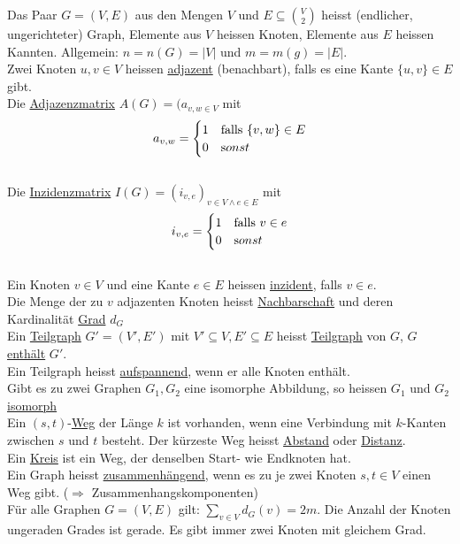 \documentclass{scrartcl}
\begin{document}
\begin{shaded}
Das Paar $G=(V,E)$ aus den Mengen $V$ und $E\subseteq\binom{V}{2}$ heisst (endlicher, ungerichteter) Graph, Elemente aus $V$ heissen Knoten, Elemente aus $E$ heissen Kannten. Allgemein: $n=n(G)=\vert V\vert$ und $m=m(g)=\vert E\vert$. \\
Zwei Knoten $u,v\in V$ heissen \underline{adjazent} (benachbart), falls es eine Kante $\{u,v\}\in E$ gibt. \\
Die \underline{Adjazenzmatrix} $A(G)=(a_{v,w\in V}$ mit \[a_{v,w}=
\begin{cases}
1 & \textrm{falls } \{v,w\} \in E \\
0 & \textrm sonst
\end{cases} \] \\
Die \underline{Inzidenzmatrix} $I(G)=(i_{v,e})_{v\in V \wedge e\in E}$ mit \[i_{v,e}=
\begin{cases}
1 & \textrm{falls } v\in e \\
0 & \textrm sonst
\end{cases} \] \\
Ein Knoten $v\in V$ und eine Kante $e\in E$ heissen \underline{inzident}, falls $v\in e$. \\
Die Menge der zu $v$ adjazenten Knoten heisst \underline{Nachbarschaft} und deren Kardinalität \underline{Grad} $d_G$\\
Ein \underline{Teilgraph} $G'=(V',E')$ mit $V'\subseteq V, E'\subseteq E$ heisst \underline{Teilgraph} von $G$, $G$ \underline{enthält} $G'$.\\
Ein Teilgraph heisst \underline{aufspannend}, wenn er alle Knoten enthält.\\
Gibt es zu zwei Graphen $G_1,G_2$ eine isomorphe Abbildung, so heissen $G_1$ und $G_2$ \underline{isomorph} \\
Ein $(s,t)$-\underline{Weg} der Länge $k$ ist vorhanden, wenn eine Verbindung mit $k$-Kanten zwischen $s$ und $t$ besteht. Der kürzeste Weg heisst \underline{Abstand} oder \underline{Distanz}. \\
Ein \underline{Kreis} ist ein Weg, der denselben Start- wie Endknoten hat. \\
Ein Graph heisst \underline{zusammenhängend}, wenn es zu je zwei Knoten $s,t\in V$ einen Weg gibt. ($\Rightarrow$ Zusammenhangskomponenten)\\
\vspace{2em}
Für alle Graphen $G=(V,E)$ gilt: $\displaystyle\sum_{v\in V}d_G(v)=2m$. Die Anzahl der Knoten ungeraden Grades ist gerade. Es gibt immer zwei Knoten mit gleichem Grad.
\end{shaded}
\end{document}
